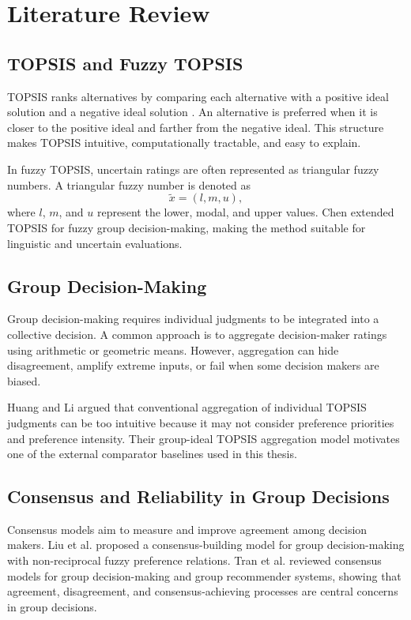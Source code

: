 \chapter{Literature Review}

\section{TOPSIS and Fuzzy TOPSIS}
TOPSIS ranks alternatives by comparing each alternative with a positive ideal solution and a negative ideal solution \cite{hwang1981}. An alternative is preferred when it is closer to the positive ideal and farther from the negative ideal. This structure makes TOPSIS intuitive, computationally tractable, and easy to explain.

In fuzzy TOPSIS, uncertain ratings are often represented as triangular fuzzy numbers. A triangular fuzzy number is denoted as
\[
\tilde{x} = (l,m,u),
\]
where \(l\), \(m\), and \(u\) represent the lower, modal, and upper values. Chen \cite{chen2000} extended TOPSIS for fuzzy group decision-making, making the method suitable for linguistic and uncertain evaluations.

\section{Group Decision-Making}
Group decision-making requires individual judgments to be integrated into a collective decision. A common approach is to aggregate decision-maker ratings using arithmetic or geometric means. However, aggregation can hide disagreement, amplify extreme inputs, or fail when some decision makers are biased.

Huang and Li \cite{huang2012} argued that conventional aggregation of individual TOPSIS judgments can be too intuitive because it may not consider preference priorities and preference intensity. Their group-ideal TOPSIS aggregation model motivates one of the external comparator baselines used in this thesis.

\section{Consensus and Reliability in Group Decisions}
Consensus models aim to measure and improve agreement among decision makers. Liu et al. \cite{liu2022} proposed a consensus-building model for group decision-making with non-reciprocal fuzzy preference relations. Tran et al. \cite{tran2024} reviewed consensus models for group decision-making and group recommender systems, showing that agreement, disagreement, and consensus-achieving processes are central concerns in group decisions.

